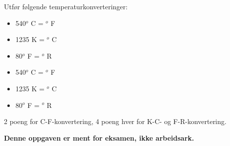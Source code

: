 

Utfør følgende temperaturkonverteringer:

\begin{itemize}
\item{} 540$^{o}$ C = \underbar{\hskip 50pt} $^{o}$ F
\vskip 5pt
\item{} 1235 K = \underbar{\hskip 50pt} $^{o}$ C
\vskip 5pt
\item{} 80$^{o}$ F = \underbar{\hskip 50pt} $^{o}$ R
\end{itemize}







\begin{itemize}
\item{} 540$^{o}$ C = $^{o}$ F
\vskip 5pt
\item{} 1235 K = $^{o}$ C
\vskip 5pt
\item{} 80$^{o}$ F = $^{o}$ R
\end{itemize}

2 poeng for C-F-konvertering, 4 poeng hver for K-C- og F-R-konvertering.







{\bf Denne oppgaven er ment for eksamen, ikke arbeidsark.}

